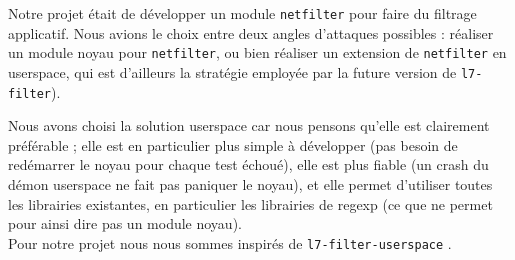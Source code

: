 Notre projet était de développer un module \verb+netfilter+ pour faire du filtrage applicatif. Nous avions le choix entre deux angles d'attaques possibles : réaliser un module noyau pour \verb+netfilter+, ou bien réaliser un extension de \verb+netfilter+ en userspace, qui est d'ailleurs la stratégie employée par la future version de \verb+l7-filter+).

Nous avons choisi la solution userspace car nous pensons qu'elle est clairement préférable ; elle est en particulier plus simple à développer (pas besoin de redémarrer le noyau pour chaque test échoué), elle est plus fiable (un crash du démon userspace ne fait pas paniquer le noyau), et elle permet d'utiliser toutes les librairies existantes, en particulier les librairies de regexp (ce que ne permet pour ainsi dire pas un module noyau).\\

Pour notre projet nous nous sommes inspirés de \verb+l7-filter-userspace+ \cite{RW}.
